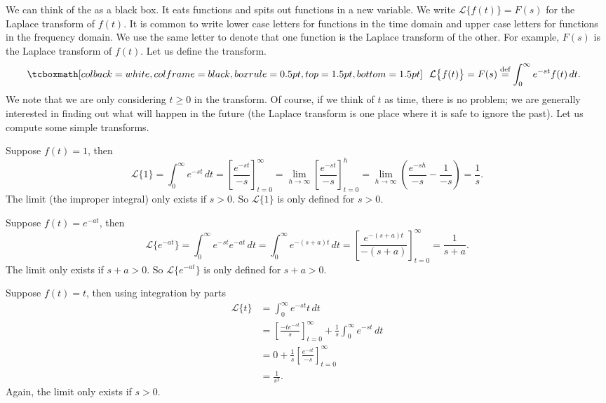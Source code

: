 We can think of the \emph{} as a black box.  It
eats functions and spits out functions in a new variable.  We write
$\mathcal{L} \bigl\{ f(t) \bigr\} = F(s)$ for the Laplace transform of $f(t)$.
It is common to write lower case letters for
functions in the time domain and upper case letters for functions in the
frequency domain.  We use the same letter to denote that one function
is the Laplace transform of the other.  For example, $F(s)$ is the Laplace
transform of $f(t)$.  Let us define the transform.
\begin{equation*}
\mybxbg{~~
\mathcal{L} \bigl\{ f(t) \bigr\} =
F(s) \overset{\text{def}}{=} \int_0^\infty e^{-st} f(t) \, dt .
~~}
\end{equation*}
We note that we are only considering $t \geq 0$ in the transform.  Of course,
if we think of $t$ as time, there is no problem; we are generally interested in
finding out what will happen in the future
(the Laplace transform is one place
where it is safe to ignore the past).
Let us compute some simple
transforms.

\begin{example}
Suppose $f(t) = 1$, then
\begin{equation*}
\mathcal{L} \{1\} = \int_0^\infty e^{-st} \, dt
=
\left[ \frac{e^{-st}}{-s} \right]_{t=0}^\infty
=
\lim_{h\to\infty}
\left[ \frac{e^{-st}}{-s} \right]_{t=0}^h
=
\lim_{h\to\infty}
\left( \frac{e^{-sh}}{-s} - \frac{1}{-s} \right)
= \frac{1}{s} .
\end{equation*}
The limit (the improper integral) only exists if $s > 0$.  So 
$\mathcal{L} \{1\}$ is only defined for $s > 0$.
\end{example}

\begin{example}
Suppose $f(t) = e^{-at}$, then
\begin{equation*}
\mathcal{L} \bigl\{e^{-at}\bigr\}
= \int_0^\infty e^{-st} e^{-at} \, dt
= \int_0^\infty e^{-(s+a)t} \, dt
=
\left[ \frac{e^{-(s+a)t}}{-(s+a)} \right]_{t=0}^\infty
= \frac{1}{s+a} .
\end{equation*}
The limit only exists if $s+a > 0$.  So 
$\mathcal{L} \bigl\{e^{-at}\bigr\}$ is only defined for $s+a > 0$.
\end{example}

\begin{example}
Suppose $f(t) = t$, then using integration by parts
\begin{equation*}
\begin{split}
\mathcal{L} \{t\}
& = \int_0^\infty e^{-st} t \, dt \\
& =
\left[ \frac{-te^{-st}}{s} \right]_{t=0}^\infty
+
\frac{1}{s}
\int_0^\infty e^{-st} \,dt \\
& =
0
+
\frac{1}{s}
\left[ \frac{e^{-st}}{-s} \right]_{t=0}^\infty \\
& =
\frac{1}{s^2} .
\end{split}
\end{equation*}
Again, the limit only exists if $s > 0$.
\end{example}

